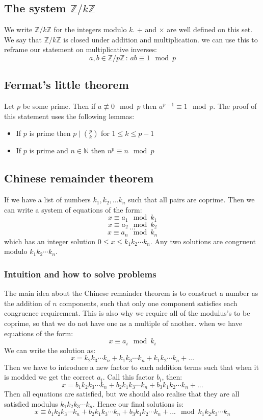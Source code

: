 \documentclass[12pt]{article}
\begin{document}
\subsection*{The system \(\mathbb{Z}/k\mathbb{Z}\)}
We write \(\mathbb{Z}/k\mathbb{Z}\) for the integers modulo \(k\). \(+\) and \(\times\) are well defined on this set. We say that \(\mathbb{Z}/k\mathbb{Z}\) is closed under addition and multiplication. we can use this to reframe our statement on multiplicative inverses:
\[a,b\in\mathbb{Z}/p\mathbb{Z}\,:\,ab\equiv1\mod{p}\]
\subsection*{Fermat's little theorem}
Let \(p\) be some prime. Then if \(a\not\equiv0\mod{p}\) then \(a^{p-1}\equiv1\mod{p}\). The proof of this statement uses the following lemmas:
\begin{itemize}
    \item If \(p\) is prime then \(p\mid \binom{p}{k}\) for \(1\leq k\leq p-1\)
    \item If \(p\) is prime and \(n\in\mathbb{N}\) then \(n^p\equiv n\mod{p}\)
\end{itemize}
\subsection*{Chinese remainder theorem}
If we have a list of numbers \(k_1,k_2,...k_n\) such that all pairs are coprime. Then we can write a system of equations of the form:
\[x\equiv a_1\mod{k_1}\]
\[x\equiv a_2\mod{k_2}\]
\[...\]
\[x\equiv a_n\mod{k_n}\]
which has an integer solution \(0\leq x\leq k_1k_2\cdots k_n\). Any two solutions are congruent modulo \(k_1k_2\cdots k_n\).
\subsubsection*{Intuition and how to solve problems}
The main idea about the Chinese remainder theorem is to construct a number as the addition of \(n\) components, such that only one component satisfies each congruence requirement. This is also why we require all of the modulus's to be coprime, so that we do not have one as a multiple of another. when we have equations of the form:
\[x\equiv a_i\mod{k_i}\]
We can write the solution as:
\[x=k_2k_3\cdots k_n+k_1k_3\cdots k_n+k_1k_2\cdots k_n+...\]
Then we have to introduce a new factor to each addition terms such that when it is modded we get the correct \(a_i\). Call this factor \(b_i\), then:
\[x=b_1k_2k_3\cdots k_n+b_2k_1k_3\cdots k_n+b_3k_1k_2\cdots k_n+...\]
Then all equations are satisfied, but we should also realise that they are all satisfied modulus \(k_1k_2k_3\cdots k_n\). Hence our final solutions is:
\[x\equiv b_1k_2k_3\cdots k_n+b_2k_1k_3\cdots k_n+b_3k_1k_2\cdots k_n+...\mod{k_1k_2k_3\cdots k_n}\]
\end{document}
